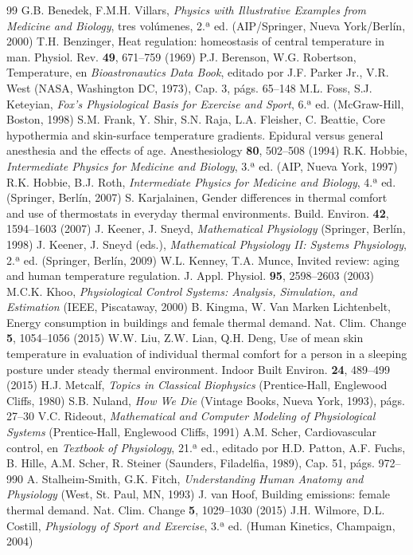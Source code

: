 \documentclass[12pt]{book}
\begin{document}
\begin{thebibliography}{99}
 G.B. Benedek, F.M.H. Villars, \textit{Physics with Illustrative Examples from Medicine and Biology}, tres volúmenes, 2.ª ed. (AIP/Springer, Nueva York/Berlín, 2000)
 T.H. Benzinger, Heat regulation: homeostasis of central temperature in man. Physiol. Rev. \textbf{49}, 671--759 (1969)
 P.J. Berenson, W.G. Robertson, Temperature, en \textit{Bioastronautics Data Book}, editado por J.F. Parker Jr., V.R. West (NASA, Washington DC, 1973), Cap. 3, págs. 65--148
 M.L. Foss, S.J. Keteyian, \textit{Fox's Physiological Basis for Exercise and Sport}, 6.ª ed. (McGraw-Hill, Boston, 1998)
 S.M. Frank, Y. Shir, S.N. Raja, L.A. Fleisher, C. Beattie, Core hypothermia and skin-surface temperature gradients. Epidural versus general anesthesia and the effects of age. Anesthesiology \textbf{80}, 502--508 (1994)
 R.K. Hobbie, \textit{Intermediate Physics for Medicine and Biology}, 3.ª ed. (AIP, Nueva York, 1997)
 R.K. Hobbie, B.J. Roth, \textit{Intermediate Physics for Medicine and Biology}, 4.ª ed. (Springer, Berlín, 2007)
 S. Karjalainen, Gender differences in thermal comfort and use of thermostats in everyday thermal environments. Build. Environ. \textbf{42}, 1594--1603 (2007)
 J. Keener, J. Sneyd, \textit{Mathematical Physiology} (Springer, Berlín, 1998)
 J. Keener, J. Sneyd (eds.), \textit{Mathematical Physiology II: Systems Physiology}, 2.ª ed. (Springer, Berlín, 2009)
 W.L. Kenney, T.A. Munce, Invited review: aging and human temperature regulation. J. Appl. Physiol. \textbf{95}, 2598--2603 (2003)
 M.C.K. Khoo, \textit{Physiological Control Systems: Analysis, Simulation, and Estimation} (IEEE, Piscataway, 2000)
 B. Kingma, W. Van Marken Lichtenbelt, Energy consumption in buildings and female thermal demand. Nat. Clim. Change \textbf{5}, 1054--1056 (2015)
 W.W. Liu, Z.W. Lian, Q.H. Deng, Use of mean skin temperature in evaluation of individual thermal comfort for a person in a sleeping posture under steady thermal environment. Indoor Built Environ. \textbf{24}, 489--499 (2015)
 H.J. Metcalf, \textit{Topics in Classical Biophysics} (Prentice-Hall, Englewood Cliffs, 1980)
 S.B. Nuland, \textit{How We Die} (Vintage Books, Nueva York, 1993), págs. 27--30
 V.C. Rideout, \textit{Mathematical and Computer Modeling of Physiological Systems} (Prentice-Hall, Englewood Cliffs, 1991)
 A.M. Scher, Cardiovascular control, en \textit{Textbook of Physiology}, 21.ª ed., editado por H.D. Patton, A.F. Fuchs, B. Hille, A.M. Scher, R. Steiner (Saunders, Filadelfia, 1989), Cap. 51, págs. 972--990
 A. Stalheim-Smith, G.K. Fitch, \textit{Understanding Human Anatomy and Physiology} (West, St. Paul, MN, 1993)
 J. van Hoof, Building emissions: female thermal demand. Nat. Clim. Change \textbf{5}, 1029--1030 (2015)
 J.H. Wilmore, D.L. Costill, \textit{Physiology of Sport and Exercise}, 3.ª ed. (Human Kinetics, Champaign, 2004)
\end{thebibliography}

\end{document}
